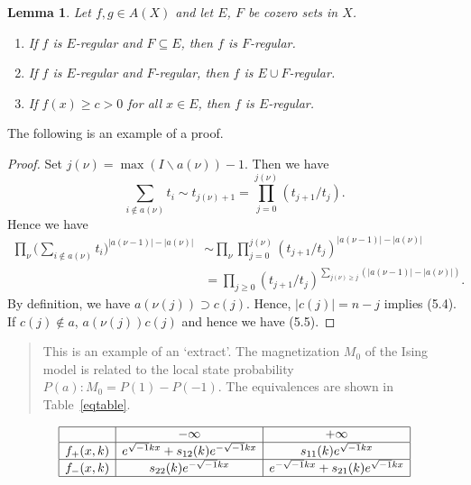\documentclass{amsart}
\newtheorem{lemma}[theorem]{Lemma}
\theoremstyle{definition}
\theoremstyle{remark}
\numberwithin{equation}{section}
\newcommand{\abs}[1]{\lvert#1\rvert}
\begin{document}
\newpage
\begin{lemma}
Let $f, g\in  A(X)$ and let $E$, $F$ be cozero
sets in $X$.
\begin{enumerate}
\item If $f$ is $E$-regular and $F\subseteq E$, then $f$ is $F$-regular.

\item If $f$ is $E$-regular and $F$-regular, then $f$ is $E\cup
F$-regular.

\item If $f(x)\ge c>0$ for all $x\in E$, then $f$ is $E$-regular.

\end{enumerate}
\end{lemma}

The following is an example of a proof.

\begin{proof} Set $j(\nu)=\max(I\backslash a(\nu))-1$. Then we have
\[
\sum_{i\notin a(\nu)}t_i\sim t_{j(\nu)+1}
  =\prod^{j(\nu)}_{j=0}(t_{j+1}/t_j).
\]
Hence we have
\begin{equation}
\begin{split}
\prod_\nu\biggl(\sum_{i\notin
  a(\nu)}t_i\biggr)^{\abs{a(\nu-1)}-\abs{a(\nu)}}
&\sim\prod_\nu\prod^{j(\nu)}_{j=0}
  (t_{j+1}/t_j)^{\abs{a(\nu-1)}-\abs{a(\nu)}}\\
&=\prod_{j\ge 0}(t_{j+1}/t_j)^{
  \sum_{j(\nu)\ge j}(\abs{a(\nu-1)}-\abs{a(\nu)})}.
\end{split}
\end{equation}
By definition, we have $a(\nu(j))\supset c(j)$. Hence, $\abs{c(j)}=n-j$
implies (5.4). If $c(j)\notin a$, $a(\nu(j))c(j)$ and hence
we have (5.5).
\end{proof}

\begin{quotation}
This is an example of an `extract'. The magnetization $M_0$ of the Ising
model is related to the local state probability $P(a):M_0=P(1)-P(-1)$.
The equivalences are shown in Table~\ref{eqtable}.
\end{quotation}

\begin{table}[ht]
\caption{}\label{eqtable}
\renewcommand\arraystretch{1.5}
\noindent\[
\begin{array}{|c|c|c|}
\hline
&{-\infty}&{+\infty}\\
\hline
{f_+(x,k)}&e^{\sqrt{-1}kx}+s_{12}(k)e^{-\sqrt{-1}kx}&s_{11}(k)e^
{\sqrt{-1}kx}\\
\hline
{f_-(x,k)}&s_{22}(k)e^{-\sqrt{-1}kx}&e^{-\sqrt{-1}kx}+s_{21}(k)e^{\sqrt
{-1}kx}\\
\hline
\end{array}
\]
\end{table}
\end{document}
